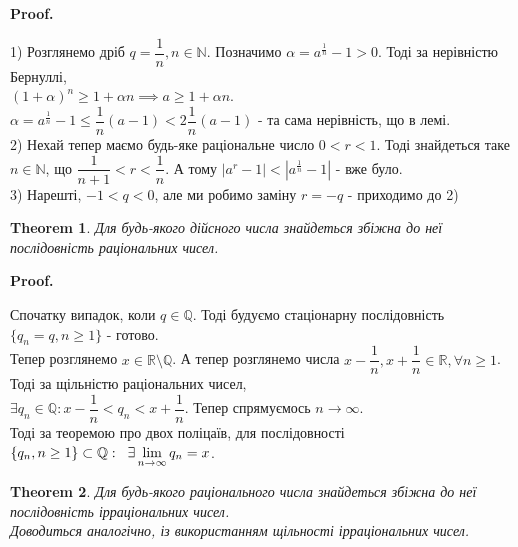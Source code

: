 \documentclass[a4paper, 14pt]{article}
\makeatletter
\def\huge{\displaystyle}
\def\qed{$\blacksquare$}
\theoremstyle{theoremdd}
\newtheorem{theorem}{Theorem}[subsection]
\theoremstyle{theoremdd}
\theoremstyle{theoremdd}
\theoremstyle{theoremdd}
\theoremstyle{theoremdd}
\theoremstyle{theoremdd}
\theoremstyle{theoremdd}
\theoremstyle{theoremdd}
\renewenvironment{proof}[1][Proof.\\]{\par
\pushQED{\hfill \qed}%
\normalfont \topsep6\p@\@plus6\p@\relax
\trivlist
\item\relax
{\bfseries
#1\@addpunct{.}}\hspace\labelsep\ignorespaces
}{%
\popQED\endtrivlist\@endpefalse
}
\makeatother
\begin{document}
\begin{proof}
1) Розглянемо дріб $q = \dfrac{1}{n}, n \in \mathbb{N}$. Позначимо $\alpha = a^{\frac{1}{n}}-1 > 0$. Тоді за нерівністю Бернуллі,\\
$(1+\alpha)^n \geq 1 + \alpha n \implies a \geq 1 + \alpha n$.\\
$\alpha = a^{\frac{1}{n}} - 1 \leq \dfrac{1}{n}(a-1) < 2 \dfrac{1}{n} (a-1)$ - та сама нерівність, що в лемі.
\bigskip \\
2) Нехай тепер маємо будь-яке раціональне число $0 < r < 1$. Тоді знайдеться таке $n \in \mathbb{N}$, що $\dfrac{1}{n+1} < r < \dfrac{1}{n}$. А тому $|a^r - 1| < |a^{\frac{1}{n}} - 1|$ - вже було.
\bigskip \\
3) Нарешті, $-1 < q < 0$, але ми робимо заміну $r = -q$ - приходимо до 2)
\end{proof}

\begin{theorem}
	Для будь-якого дійсного числа знайдеться збіжна до неї послідовність раціональних чисел.
\end{theorem}
	
	\begin{proof}
	Спочатку випадок, коли $q \in \mathbb{Q}$. Тоді будуємо стаціонарну послідовність $\{q_n = q, n \geq 1\}$ - готово.
	\bigskip \\
	Тепер розглянемо $x \in \mathbb{R} \setminus \mathbb{Q}$. А тепер розглянемо числа $x - \dfrac{1}{n}, x + \dfrac{1}{n} \in \mathbb{R}, \forall n \geq 1$. Тоді за щільністю раціональних чисел,\\
	$\exists q_n \in \mathbb{Q}: x - \dfrac{1}{n} < q_n < x + \dfrac{1}{n}$. Тепер спрямуємось $n \to \infty$. \\
	Тоді за теоремою про двох поліцаїв, для послідовності $\{q_n, n \geq 1\} \subset \mathbb{Q}: \hspace{0.2cm} \exists \huge\lim_{n \to \infty} q_n = x$.
	\end{proof}
	
	\begin{theorem}
	Для будь-якого раціонального числа знайдеться збіжна до неї послідовність ірраціональних чисел.\\
	\textit{Доводиться аналогічно, із використанням щільності ірраціональних чисел.}
	\end{theorem}
\end{document}
